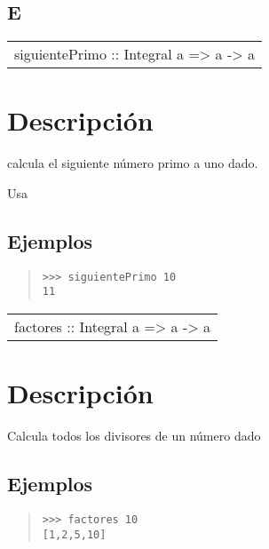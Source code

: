 \subsection{E}
\begin{haddockdesc}
\item[\begin{tabular}{@{}l}
siguientePrimo :: Integral a => a -> a
\end{tabular}]
{\haddockbegindoc
\section*{Descripción}
calcula el siguiente número primo a uno dado.\par
Usa \par
\subsection*{Ejemplos}
\begin{quote}
{\haddockverb\begin{verbatim}
>>> siguientePrimo 10
11

\end{verbatim}}
\end{quote}}
\end{haddockdesc}
\begin{haddockdesc}
\item[\begin{tabular}{@{}l}
factores :: Integral a => a -> {\char 91}a{\char 93}
\end{tabular}]
{\haddockbegindoc
\section*{Descripción}
Calcula todos los divisores de un número dado\par
\subsection*{Ejemplos}
\begin{quote}
{\haddockverb\begin{verbatim}
>>> factores 10
[1,2,5,10]

\end{verbatim}}
\end{quote}}
\end{haddockdesc}
